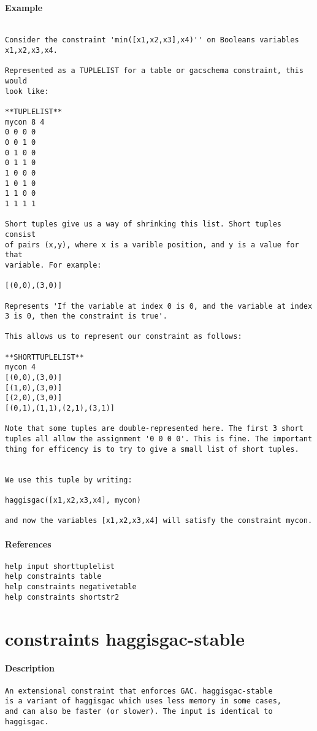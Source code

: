 \paragraph{Example}
{\footnotesize
\begin{verbatim}

Consider the constraint 'min([x1,x2,x3],x4)'' on Booleans variables
x1,x2,x3,x4.

Represented as a TUPLELIST for a table or gacschema constraint, this would
look like:

**TUPLELIST**
mycon 8 4
0 0 0 0
0 0 1 0
0 1 0 0
0 1 1 0
1 0 0 0
1 0 1 0
1 1 0 0
1 1 1 1

Short tuples give us a way of shrinking this list. Short tuples consist
of pairs (x,y), where x is a varible position, and y is a value for that 
variable. For example:

[(0,0),(3,0)]

Represents 'If the variable at index 0 is 0, and the variable at index
3 is 0, then the constraint is true'.

This allows us to represent our constraint as follows:

**SHORTTUPLELIST**
mycon 4
[(0,0),(3,0)]
[(1,0),(3,0)]
[(2,0),(3,0)]
[(0,1),(1,1),(2,1),(3,1)]

Note that some tuples are double-represented here. The first 3 short
tuples all allow the assignment '0 0 0 0'. This is fine. The important
thing for efficency is to try to give a small list of short tuples.


We use this tuple by writing:

haggisgac([x1,x2,x3,x4], mycon)

and now the variables [x1,x2,x3,x4] will satisfy the constraint mycon.
\end{verbatim}
}
\paragraph{References}
{\footnotesize
\begin{verbatim}
help input shorttuplelist
help constraints table
help constraints negativetable
help constraints shortstr2
\end{verbatim}
}
\section{constraints haggisgac-stable}
\paragraph{Description}
{\footnotesize
\begin{verbatim}
An extensional constraint that enforces GAC. haggisgac-stable
is a variant of haggisgac which uses less memory in some cases,
and can also be faster (or slower). The input is identical to
haggisgac.
\end{verbatim}
}
